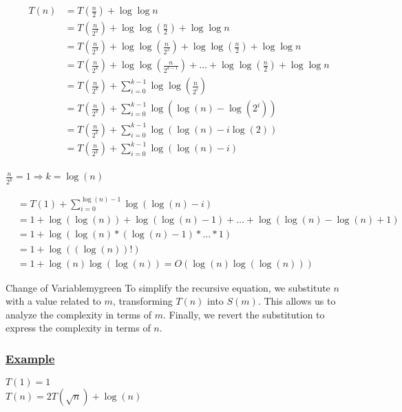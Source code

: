 \begin{align*}
    T(n) &= T(\frac{n}{2}) + \log\log n\\
  &= T(\frac{n}{2^2}) +\log\log(\frac{n}{2}) +\log\log n\\
  &= T(\frac{n}{2^3})+ \log\log(\frac{n}{2^2}) +\log\log(\frac{n}{2}) +\log\log n\\
  &= T(\frac{n}{2^k})+ \log\log(\frac{n}{2^{k-1}})+\dots +\log\log(\frac{n}{2}) +\log\log n\\ 
  &= T(\frac{n}{2^k}) +\sum_{i=0}^{k-1} \log\log(\frac{n}{2^i})\\
  &= T(\frac{n}{2^k}) +\sum_{i=0}^{k-1} \log(\log(n) - \log(2^i))\\
  &= T(\frac{n}{2^k}) +\sum_{i=0}^{k-1} \log(\log(n) - i\log(2))\\
  &= T(\frac{n}{2^k}) +\sum_{i=0}^{k-1} \log(\log(n) - i)\\
\end{align*}


\(\frac{n}{2^k} = 1 \Rightarrow \boxed{k = \log(n)}\)

\begin{align*}
    &= T(1) +\sum_{i=0}^{\log(n)-1} \log(\log(n) - i)\\
    &= 1 + \log(\log(n)) + \log(\log(n) - 1)+ \dots +\log(\log(n) - \log(n) +1)\\
    &= 1 + \log(\log(n)*(\log(n)-1)*\dots*1) \\
    &= 1+\log((\log(n))!)\\
    &= 1+\log(n)\log(\log(n)) = \boxed{ O(\log(n)\log(\log(n)))}
\end{align*}

\vspace{1.5cm}


\begin{prettyBox}{Change of Variable}{mygreen}
To simplify the recursive equation, we substitute \(n\) with a value related to \(m\), transforming \(T(n)\) into \(S(m)\).  
This allows us to analyze the complexity in terms of \(m\).  
Finally, we revert the substitution to express the complexity in terms of \(n\).
\end{prettyBox}

\newpage

\subsubsection*{\underline{Example}}
\(T(1) = 1\)\\
\(T(n) = 2T(\sqrt{n}) + \log(n)\)\\[0.15cm]

